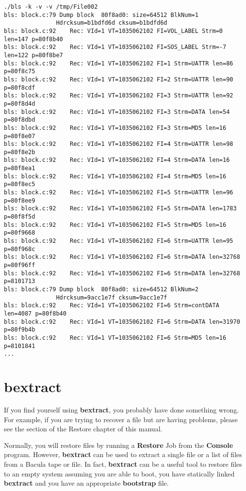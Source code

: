 \footnotesize
\begin{verbatim}
./bls -k -v -v /tmp/File002
bls: block.c:79 Dump block  80f8ad0: size=64512 BlkNum=1
               Hdrcksum=b1bdfd6d cksum=b1bdfd6d
bls: block.c:92    Rec: VId=1 VT=1035062102 FI=VOL_LABEL Strm=0 len=147 p=80f8b40
bls: block.c:92    Rec: VId=1 VT=1035062102 FI=SOS_LABEL Strm=-7 len=122 p=80f8be7
bls: block.c:92    Rec: VId=1 VT=1035062102 FI=1 Strm=UATTR len=86 p=80f8c75
bls: block.c:92    Rec: VId=1 VT=1035062102 FI=2 Strm=UATTR len=90 p=80f8cdf
bls: block.c:92    Rec: VId=1 VT=1035062102 FI=3 Strm=UATTR len=92 p=80f8d4d
bls: block.c:92    Rec: VId=1 VT=1035062102 FI=3 Strm=DATA len=54 p=80f8dbd
bls: block.c:92    Rec: VId=1 VT=1035062102 FI=3 Strm=MD5 len=16 p=80f8e07
bls: block.c:92    Rec: VId=1 VT=1035062102 FI=4 Strm=UATTR len=98 p=80f8e2b
bls: block.c:92    Rec: VId=1 VT=1035062102 FI=4 Strm=DATA len=16 p=80f8ea1
bls: block.c:92    Rec: VId=1 VT=1035062102 FI=4 Strm=MD5 len=16 p=80f8ec5
bls: block.c:92    Rec: VId=1 VT=1035062102 FI=5 Strm=UATTR len=96 p=80f8ee9
bls: block.c:92    Rec: VId=1 VT=1035062102 FI=5 Strm=DATA len=1783 p=80f8f5d
bls: block.c:92    Rec: VId=1 VT=1035062102 FI=5 Strm=MD5 len=16 p=80f9668
bls: block.c:92    Rec: VId=1 VT=1035062102 FI=6 Strm=UATTR len=95 p=80f968c
bls: block.c:92    Rec: VId=1 VT=1035062102 FI=6 Strm=DATA len=32768 p=80f96ff
bls: block.c:92    Rec: VId=1 VT=1035062102 FI=6 Strm=DATA len=32768 p=8101713
bls: block.c:79 Dump block  80f8ad0: size=64512 BlkNum=2
               Hdrcksum=9acc1e7f cksum=9acc1e7f
bls: block.c:92    Rec: VId=1 VT=1035062102 FI=6 Strm=contDATA len=4087 p=80f8b40
bls: block.c:92    Rec: VId=1 VT=1035062102 FI=6 Strm=DATA len=31970 p=80f9b4b
bls: block.c:92    Rec: VId=1 VT=1035062102 FI=6 Strm=MD5 len=16 p=8101841
...
\end{verbatim}
\normalsize

\section{bextract}
\label{bextract}

If you find yourself using {\bf bextract}, you probably have done
something wrong. For example, if you are trying to recover a file
but are having problems, please see the  section of the Restore chapter of this manual.

Normally, you will restore files by running a {\bf Restore} Job from the {\bf
Console} program. However, {\bf bextract} can be used to extract a single file
or a list of files from a Bacula tape or file. In fact, {\bf bextract} can be
a useful tool to restore files to an empty system assuming you are able to
boot, you have statically linked {\bf bextract} and you have an appropriate
{\bf bootstrap} file. 

